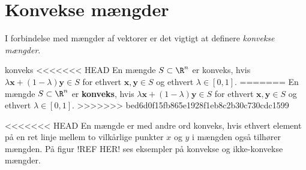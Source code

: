 \section{Konvekse mængder}
%
I forbindelse med mængder af vektorer er det vigtigt at definere \textit{konvekse mængder}.
\begin{defn}{}{konveks}
<<<<<<< HEAD
En mængde $S \subset \R^n$ er konveks, hvis $ \lambda \textbf{x} + (1-\lambda )\textbf{y} \in S$ for ethvert $\textbf{x}, \textbf{y} \in S$ og ethvert $ \lambda \in [0,1]$. 
=======
En mængde $S \subset \R^n$ er \textbf{konveks}, hvis $\lambda \textbf{x} + (1- \lambda ) \textbf{y} \in S$ for ethvert $\textbf{x}, \textbf{y} \in S$ og ethvert $\lambda \in [0,1]$. 
>>>>>>> bed6d0f15fb865e1928f1eb8c2b30c730cdc1599
\end{defn}
\noindent
%
<<<<<<< HEAD
En mængde er med andre ord konveks, hvis ethvert element på en ret linje mellem to vilkårlige punkter $x$ og $y$ i mængden også tilhører mængden. 
På figur !REF HER! ses eksempler på konvekse og ikke-konvekse mængder. 
%
